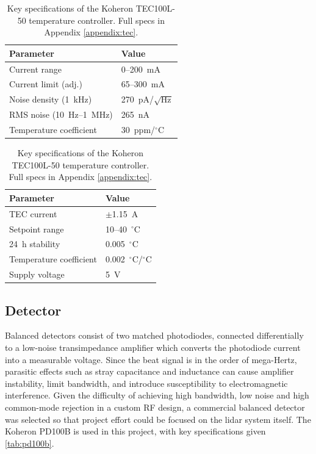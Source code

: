  \begin{table}[H]
 	\centering
 	\begin{minipage}[t]{0.48\textwidth}
 		\centering
 		
 		\begin{tabular}{@{}ll@{}}
 			\toprule
 			\textbf{Parameter} & \textbf{Value} \\
 			\midrule
 			Current range             & 0--200~mA \\
 			Current limit (adj.)      & 65--300~mA \\
 			Noise density (1~kHz)     & 270~pA/$\sqrt{\text{Hz}}$ \\
 			RMS noise (10~Hz--1~MHz)  & 265~nA \\
 			Temperature coefficient   & 30~ppm/$^\circ$C \\
 			\bottomrule
 		\end{tabular}
 		\caption{Key specifications of the Koheron DRV200S-A-200
 			laser diode driver. Full specs in Appendix \ref{appendix:driver}.}
 			\label{tab:drv200s}
 	\end{minipage}
 	\hfill
 	\begin{minipage}[t]{0.48\textwidth}
 		\centering
 		
 		\begin{tabular}{@{}ll@{}}
 			\toprule
 			\textbf{Parameter} & \textbf{Value} \\
 			\midrule
 			TEC current               & $\pm$1.15~A \\
 			Setpoint range            & 10--40~$^\circ$C \\
 			24~h stability            & 0.005~$^\circ$C \\
 			Temperature coefficient   & 0.002~$^\circ$C/$^\circ$C \\
 			Supply voltage            & 5~V \\
 			\bottomrule
 		\end{tabular}
 		\caption{Key specifications of the Koheron TEC100L-50
 			temperature controller. Full specs in Appendix \ref{appendix:tec}.}
 			\label{tab:tec100l}
 	\end{minipage}
 \end{table}
 
 \subsection{Detector}
 Balanced detectors consist of two matched photodiodes, connected differentially to a low-noise transimpedance amplifier which converts the photodiode current into a measurable voltage. Since the beat signal is in the order of mega-Hertz, parasitic effects such as stray capacitance and inductance can cause amplifier instability, limit bandwidth, and introduce susceptibility to electromagnetic interference. Given the difficulty of achieving high bandwidth, low noise and high common-mode rejection in a custom RF design, a commercial balanced detector was selected so that project effort could be focused on the lidar system itself. The Koheron PD100B is used in this project, with key specifications given \autoref{tab:pd100b}.
 
